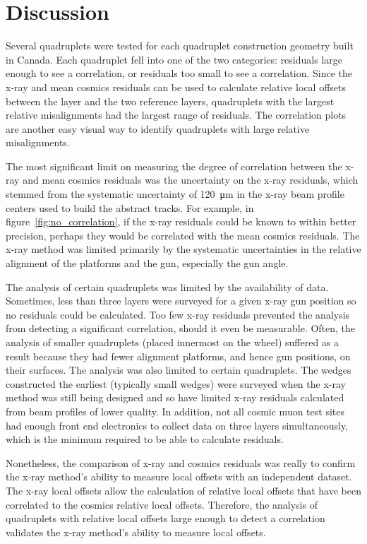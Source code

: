 \section{Discussion}

Several quadruplets were tested for each quadruplet construction geometry built in Canada. Each quadruplet fell into one of the two categories: residuals large enough to see a correlation, or residuals too small to see a correlation. Since the x-ray and mean cosmics residuals can be used to calculate relative local offsets between the layer and the two reference layers, quadruplets with the largest relative misalignments had the largest range of residuals. The correlation plots are another easy visual way to identify quadruplets with large relative misalignments.

The most significant limit on measuring the degree of correlation between the x-ray and mean cosmics residuals was the uncertainty on the x-ray residuals, which stemmed from the systematic uncertainty of \SI{120}{\micro\meter} in the x-ray beam profile centers used to build the abstract tracks. For example, in figure~\ref{fig:no_correlation}, if the x-ray residuals could be known to within better precision, perhaps they would be correlated with the mean cosmics residuals. The x-ray method was limited primarily by the systematic uncertainties in the relative alignment of the platforms and the gun, especially the gun angle.

The analysis of certain quadruplets was limited by the availability of data. Sometimes, less than three layers were surveyed for a given x-ray gun position so no residuals could be calculated. Too few x-ray residuals prevented the analysis from detecting a significant correlation, should it even be measurable. Often, the analysis of smaller quadruplets (placed innermost on the wheel) suffered as a result because they had fewer alignment platforms, and hence gun positions, on their surfaces. The analysis was also limited to certain quadruplets. The wedges constructed the earliest (typically small wedges) were surveyed when the x-ray method was still being designed and so have limited x-ray residuals calculated from beam profiles of lower quality. In addition, not all cosmic muon test sites had enough front end electronics to collect data on three layers simultaneously, which is the minimum required to be able to calculate residuals.

Nonetheless, the comparison of x-ray and cosmics residuals was really to confirm the x-ray method's ability to measure local offsets with an independent dataset. The x-ray local offsets allow the calculation of relative local offsets that have been correlated to the cosmics relative local offsets. Therefore, the analysis of quadruplets with relative local offsets large enough to detect a correlation validates the x-ray method's ability to measure local offsets. 

